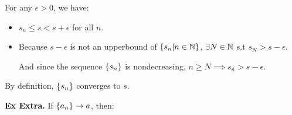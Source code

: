 \begin{enumerate}[label=(\roman*)]
\begin{itemize}
        For any $\epsilon > 0$, we have:
        \begin{itemize}[label=+)]
            \item $s_n \leq s < s + \epsilon$ for all $n$.
            \item Because $s - \epsilon$ is not an upperbound of $\left\{s_n | n\in\mathbb{N}\right\}$, $\exists N\in\mathbb{N}$ s.t $s_N > s-\epsilon$.
            
            And since the sequence $\left\{s_n\right\}$ is nondecreasing, $n\geq N \implies s_n > s-\epsilon$.
        \end{itemize}
        By definition, $\left\{s_n\right\}$ converges to $s$.
    \end{itemize}
\end{enumerate}

\noindent \textbf{Ex Extra.} \label{ex:1.5.extra}
If $\left\{a_n\right\}\to a$, then:
